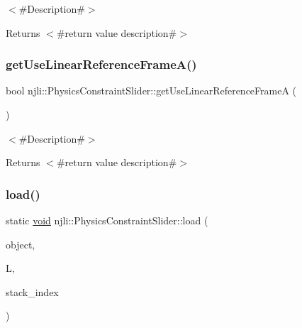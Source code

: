 $<$\#\+Description\#$>$

\begin{DoxyReturn}{Returns}
$<$\#return value description\#$>$ 
\end{DoxyReturn}
\mbox{\label{classnjli_1_1_physics_constraint_slider_a3c2943c9560065c56e41b14ef38d9060}} 
\subsubsection{\texorpdfstring{get\+Use\+Linear\+Reference\+Frame\+A()}{getUseLinearReferenceFrameA()}}
{\footnotesize\ttfamily bool njli\+::\+Physics\+Constraint\+Slider\+::get\+Use\+Linear\+Reference\+FrameA (\begin{DoxyParamCaption}{ }\end{DoxyParamCaption})}

$<$\#\+Description\#$>$

\begin{DoxyReturn}{Returns}
$<$\#return value description\#$>$ 
\end{DoxyReturn}
\mbox{\label{classnjli_1_1_physics_constraint_slider_a7fcf7e1b1ba501fbe1429e17db845e59}} 
\subsubsection{\texorpdfstring{load()}{load()}}
{\footnotesize\ttfamily static \mbox{\hyperlink{_thread_8h_af1e856da2e658414cb2456cb6f7ebc66}{void}} njli\+::\+Physics\+Constraint\+Slider\+::load (\begin{DoxyParamCaption}\item[{\mbox{\hyperlink{classnjli_1_1_physics_constraint_slider}{Physics\+Constraint\+Slider}} \&}]{object,  }\item[{lua\+\_\+\+State $\ast$}]{L,  }\item[{int}]{stack\+\_\+index }\end{DoxyParamCaption})\hspace{0.3cm}{\ttfamily [static]}}


